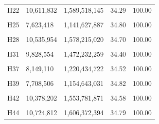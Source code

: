 \documentclass[
  a4paper,
  titlepage]{article}
\begin{document}
\begin{longtable}[t]{lllll}
H22 & 10,611,832 & 1,589,518,145 & 34.29 & 100.00\\
 
\cellcolor{gray!6}{H23} & \cellcolor{gray!6}{7,582,404} & \cellcolor{gray!6}{1,135,519,100} & \cellcolor{gray!6}{34.52} & \cellcolor{gray!6}{100.00}\\
 
H25 & 7,623,418 & 1,141,627,887 & 34.80 & 100.00\\
 
\cellcolor{gray!6}{H26} & \cellcolor{gray!6}{9,024,440} & \cellcolor{gray!6}{1,351,395,898} & \cellcolor{gray!6}{35.02} & \cellcolor{gray!6}{100.00}\\
 
H28 & 10,535,954 & 1,578,215,020 & 34.70 & 100.00\\
 
\cellcolor{gray!6}{H30} & \cellcolor{gray!6}{9,513,590} & \cellcolor{gray!6}{1,424,738,234} & \cellcolor{gray!6}{34.46} & \cellcolor{gray!6}{100.00}\\
 
H31 & 9,828,554 & 1,472,232,259 & 34.40 & 100.00\\
 
\cellcolor{gray!6}{H36} & \cellcolor{gray!6}{11,699,752} & \cellcolor{gray!6}{1,752,490,161} & \cellcolor{gray!6}{34.82} & \cellcolor{gray!6}{100.00}\\
 
H37 & 8,149,110 & 1,220,434,722 & 34.52 & 100.00\\
 
\cellcolor{gray!6}{H38} & \cellcolor{gray!6}{10,389,144} & \cellcolor{gray!6}{1,555,769,286} & \cellcolor{gray!6}{34.54} & \cellcolor{gray!6}{100.00}\\
 
H39 & 7,708,506 & 1,154,643,031 & 34.82 & 100.00\\
 
\cellcolor{gray!6}{H41} & \cellcolor{gray!6}{12,309,124} & \cellcolor{gray!6}{1,843,598,046} & \cellcolor{gray!6}{34.70} & \cellcolor{gray!6}{100.00}\\
 
H42 & 10,378,202 & 1,553,781,871 & 34.58 & 100.00\\
 
\cellcolor{gray!6}{H43} & \cellcolor{gray!6}{8,385,286} & \cellcolor{gray!6}{1,256,056,917} & \cellcolor{gray!6}{35.03} & \cellcolor{gray!6}{100.00}\\
 
H44 & 10,724,812 & 1,606,372,394 & 34.79 & 100.00\\
 

\end{longtable}
\end{document}

